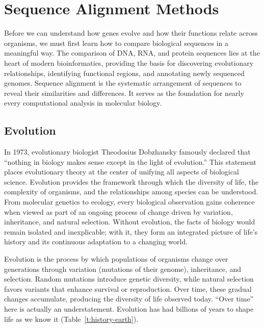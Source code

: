 \chapter{Sequence Alignment Methods}
\label{ch:alignment}
Before we can understand how genes evolve and how their functions relate across organisms,  we must first learn how to compare biological sequences in a meaningful way.  The comparison of DNA, RNA, and protein sequences lies at the heart of modern bioinformatics, providing the basis for discovering evolutionary relationships, identifying functional regions, and annotating newly sequenced genomes. Sequence alignment is the systematic arrangement of sequences to reveal their similarities and differences. It serves as the foundation for nearly every computational analysis in molecular biology.

\section{Evolution}

In 1973, evolutionary biologist Theodosius Dobzhansky famously declared that ``nothing in biology makes sense except in the light of evolution.''
This statement places evolutionary theory at the center of unifying all aspects of biological science. Evolution provides the framework through which the diversity of life, the complexity of organisms, and the relationships among species can be understood. From molecular genetics to ecology, every biological observation gains coherence when viewed as part of an ongoing process of change driven by variation, inheritance, and natural selection. Without evolution, the facts of biology would remain isolated and inexplicable; with it, they form an integrated picture of life’s history and its continuous adaptation to a changing world.

Evolution 
is the process by which populations of organisms change over generations through variation (mutations of their genome), inheritance, and selection. Random mutations introduce genetic diversity, while natural selection favors variants that enhance survival or reproduction. Over time, these gradual changes accumulate, producing the diversity of life observed today. ``Over time'' here is actually an understatement. Evolution has had billions of years to shape life as we know it (Table~\ref{t:history-earth}).

